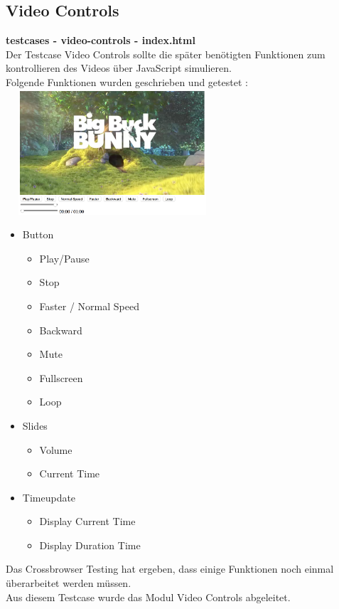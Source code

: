\documentclass[a4paper,10pt]{scrartcl}
\begin{document}
\subsection{Video Controls}
\textbf{testcases - video-controls - index.html} \\
Der Testcase Video Controls sollte die später benötigten Funktionen zum kontrollieren des Videos über JavaScript simulieren.\\ Folgende Funktionen wurden geschrieben und getestet : \\
\includegraphics[height=176px, width=300px]{images/videocontrols.png}\\
\begin{itemize}
	\item Button
	\begin{itemize}
		\item Play/Pause
		\item Stop
		\item Faster / Normal Speed
		\item Backward
		\item Mute
		\item Fullscreen
		\item Loop
	\end{itemize}
	\item Slides
	\begin{itemize}
		\item Volume
		\item Current Time
	\end{itemize}
	\item Timeupdate
	\begin{itemize}
		\item Display Current Time
		\item Display Duration Time
	\end{itemize}
\end{itemize}
Das Crossbrowser Testing hat ergeben, dass einige Funktionen noch einmal überarbeitet werden müssen.\\
Aus diesem Testcase wurde das Modul Video Controls abgeleitet. 
\newpage
\end{document}
